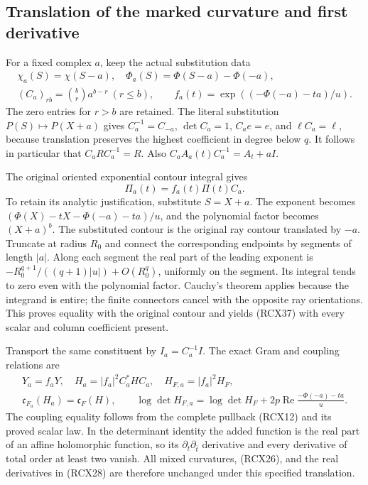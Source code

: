 \subsection{Translation of the marked curvature and first derivative}

For a fixed complex \(a\), keep the actual substitution data
\[
\begin{gathered}
 \chi_a(S)=\chi(S-a),\quad
 \Phi_a(S)=\Phi(S-a)-\Phi(-a),\\
 (C_a)_{rb}=\binom br a^{b-r}\ (r\le b),\qquad
 f_a(t)=\exp((-\Phi(-a)-ta)/u).
\end{gathered}\tag{RCX36}
\]
The zero entries for \(r>b\) are retained. The literal substitution
\(P(S)\mapsto P(X+a)\) gives
\(C_a^{-1}=C_{-a}\), \(\det C_a=1\), \(C_ae=e\), and
\(\ell C_a=\ell\), because translation preserves the highest
coefficient in degree below \(q\). It follows in particular that
\(C_aRC_a^{-1}=R\). Also
\(C_aA_a(t)C_a^{-1}=A_t+aI\).

The original oriented exponential contour integral gives
\[
 \Pi_a(t)=f_a(t)\Pi(t)C_a.
 \tag{RCX37}
\]
To retain its analytic justification, substitute \(S=X+a\).
The exponent becomes
\((\Phi(X)-tX-\Phi(-a)-ta)/u\), and the polynomial factor becomes
\((X+a)^b\). The substituted contour is the original ray contour
translated by \(-a\). Truncate at radius \(R_0\) and connect the
corresponding endpoints by segments of length \(|a|\). Along each
segment the real part of the leading exponent is
\(-R_0^{q+1}/((q+1)|u|)+O(R_0^q)\), uniformly on the segment.
Its integral tends to zero even with the polynomial factor.
Cauchy's theorem applies because the integrand is entire; the
finite connectors cancel with the opposite ray orientations.
This proves equality with the original contour and yields
(RCX37) with every scalar and column coefficient present.

Transport the same constituent by \(I_a=C_a^{-1}I\). The exact
Gram and coupling relations are
\[
\begin{gathered}
 Y_a=f_aY,\quad H_a=|f_a|^2C_a^*HC_a,\quad
 H_{F,a}=|f_a|^2H_F,\\
 \mathfrak c_{F_a}(H_a)=\mathfrak c_F(H),\qquad
 \log\det H_{F,a}
 =\log\det H_F+2p\operatorname{Re}\frac{-\Phi(-a)-ta}{u}.
\end{gathered}\tag{RCX38}
\]
The coupling equality follows from the complete pullback
(RCX12) and its proved scalar law. In the determinant identity
the added function is the real part of an affine holomorphic
function, so its \(\partial_t\partial_{\bar t}\) derivative and
every derivative of total order at least two vanish. All mixed
curvatures, (RCX26), and the real derivatives in (RCX28) are
therefore unchanged under this specified translation.

